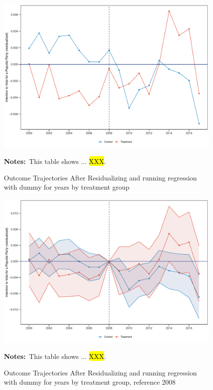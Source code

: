 \documentclass[11pt]{article}
\begin{document}
\begin{figure}[htbp!]
    \centering
    \caption{Outcome Trajectories After Residualizing and running regression with dummy for years by treatment group}\label{fig:pp_mean_outcome_cbk_past_mean_p50_noife_allyears}
    \includegraphics[width=1\linewidth]{events/pp_mean_outcome_cbk_past_mean_p50_noife_allyears}
    \begin{tablenotes}
        \footnotesize
        \item \textbf{Notes:}~This table shows ... \hl{XXX}.
    \end{tablenotes} 
\end{figure}

\begin{figure}[htbp!]
    \centering
    \caption{Outcome Trajectories After Residualizing and running regression with dummy for years by treatment group, reference 2008}\label{fig:pp_mean_outcome_cbk_past_mean_p50_noife}
    \includegraphics[width=1\linewidth]{events/pp_mean_outcome_cbk_past_mean_p50_noife}
    \begin{tablenotes}
        \footnotesize
        \item \textbf{Notes:}~This table shows ... \hl{XXX}.
    \end{tablenotes} 
\end{figure}
\end{document}
